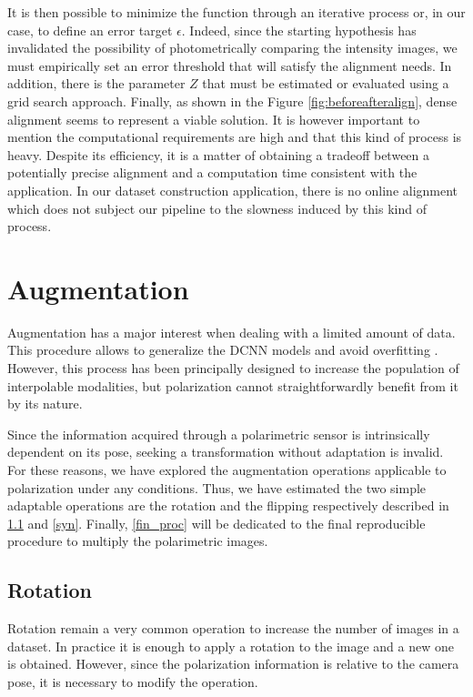 It is then possible to minimize the function through an iterative process or, in our case, to define an error target $\epsilon$. Indeed, since the starting hypothesis has invalidated the possibility of photometrically comparing the intensity images, we must empirically set an error threshold that will satisfy the alignment needs.
In addition, there is the parameter $Z$ that must be estimated or evaluated using a grid search approach. Finally, as shown in the Figure \ref{fig:beforeafteralign}, dense alignment seems to represent a viable solution. It is however important to mention the computational requirements are high and that this kind of process is heavy. Despite its efficiency, it is a matter of obtaining a tradeoff between a potentially precise alignment and a computation time consistent with the application.
In our dataset construction application, there is no online alignment which does not subject our pipeline to the slowness induced by this kind of process.

\section{Augmentation}\label{aug_4}

Augmentation has a major interest when dealing with a limited amount of data. This procedure allows to generalize the DCNN models and avoid overfitting \cite{DBLP:journals/corr/abs-1712-04621}.
However, this process has been principally designed to increase the population of interpolable modalities, but polarization cannot straightforwardly benefit from it by its nature.

Since the information acquired through a polarimetric sensor is intrinsically dependent on its pose, seeking a transformation without adaptation is invalid.
For these reasons, we have explored the augmentation operations applicable to polarization under any conditions.
Thus, we have estimated the two simple adaptable operations are the rotation and the flipping respectively described in \ref{rot} and \ref{syn}.
Finally, \ref{fin_proc} will be dedicated to the final reproducible procedure to multiply the polarimetric images.

\subsection{Rotation}\label{rot}

Rotation remain a very common operation to increase the number of images in a dataset. In practice it is enough to apply a rotation to the image and a new one is obtained. However, since the polarization information is relative to the camera pose, it is necessary to modify the operation.

